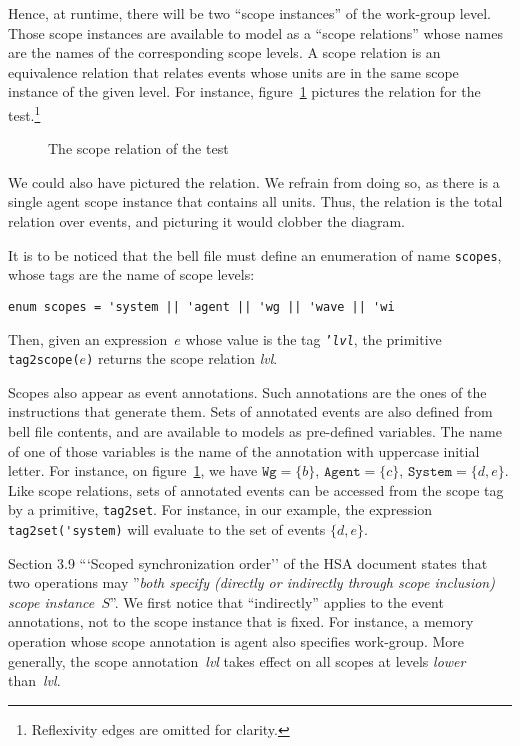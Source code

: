 \documentclass[a4paper]{article}
\begin{document}
Hence, at runtime, there will be two ``scope instances'' of the work-group
level. Those scope instances are available to \cat{} model as a ``scope
relations'' whose names are the names of the corresponding scope levels.
A scope relation is an equivalence relation that relates events whose units
are in the same scope instance of the given level.
For instance, figure~\ref{isa2scopes} pictures the \wg{} relation
for the  test.\footnote{Reflexivity edges are omitted for clarity.}
\begin{figure}
\caption{\label{isa2scopes} The \wg{} scope relation of the  test}
\begin{center}\hspace*{-2cm}\end{center}
\end{figure}
We could also have pictured the \agent{} relation. We refrain from doing so,
as there is a single agent scope instance that contains all units.
Thus, the \agent{} relation is the total relation over events,
and picturing it would clobber the diagram.

It is to be noticed that the bell file must define
an enumeration of name \texttt{scopes},
whose tags are the name of scope levels:
\begin{verbatim}
enum scopes = 'system || 'agent || 'wg || 'wave || 'wi
\end{verbatim}
Then, given an expression~$e$ whose value is the
tag \texttt{'\textit{lvl}}, the primitive \texttt{tag2scope($e$)} returns
the scope relation \textit{lvl}.

Scopes also appear as event annotations. Such annotations are the ones
of the instructions that generate them.
Sets of annotated events are also defined from bell file contents,
and are available to \cat{} models as pre-defined variables.
The name of one of those variables is the name
of the annotation with uppercase initial letter.
For instance, on figure~\ref{isa2scopes}, we have
$\texttt{Wg} = \{ b \}$,
$\texttt{Agent} = \{ c \}$,
$\texttt{System} = \{ d,e \}$.
Like scope relations, sets of annotated events can be accessed
from the scope tag by a primitive, \verb+tag2set+.
For instance, in our  example,
the expression \verb+tag2set('system)+ will evaluate to the set
of events $\{d,e\}$.

Section 3.9 ```Scoped synchronization order'' of the HSA document
states that two operations may ''\emph{both specify (directly or indirectly
through scope inclusion) scope instance~$S$}''.
We first notice that ``indirectly'' applies to the event annotations,
not to the scope instance that is fixed.
For instance, a memory operation whose scope annotation is agent also
specifies work-group.
More generally, the scope annotation~\textit{lvl} takes effect on
all scopes at levels \emph{lower} than~\textit{lvl}.
\end{document}
